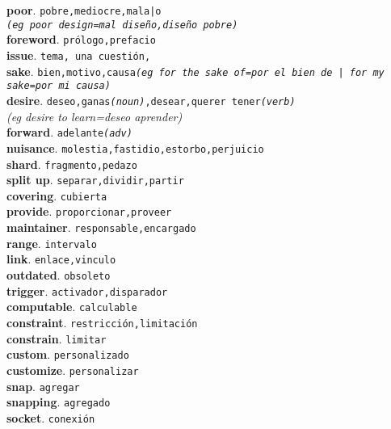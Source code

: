 \documentclass[twocolumn]{article}
\begin{document}
	\textsf{\textbf{poor}}. \texttt{pobre,mediocre,mala|o\\{\scriptsize \textsl{(eg poor design=mal dise\~no,dise\~no pobre)}}}\\
	\textsf{\textbf{foreword}}. \texttt{pr\'ologo,prefacio}\\
	\textsf{\textbf{issue}}. \texttt{tema, una cuesti\'on,}\\
	\textsf{\textbf{sake}}. \texttt{bien,motivo,causa{\scriptsize \textsl{(eg for the sake of=por el bien de | for my sake=por mi causa)}}}\\
	\textsf{\textbf{desire}}. \texttt{deseo,ganas{\scriptsize \textsl{(noun)}},desear,querer tener{\scriptsize \textsl{(verb)}}}\\{\scriptsize \textsl{(eg desire to learn=deseo aprender)}}\\
	\textsf{\textbf{forward}}. \texttt{adelante{\scriptsize \textsl{(adv)}}}\\
	\textsf{\textbf{nuisance}}. \texttt{molestia,fastidio,estorbo,perjuicio}\\
	\textsf{\textbf{shard}}. \texttt{fragmento,pedazo}\\
	\textsf{\textbf{split up}}. \texttt{separar,dividir,partir}\\
	\textsf{\textbf{covering}}. \texttt{cubierta}\\
	\textsf{\textbf{provide}}. \texttt{proporcionar,proveer}\\
	\textsf{\textbf{maintainer}}. \texttt{responsable,encargado}\\
	\textsf{\textbf{range}}. \texttt{intervalo}\\
	\textsf{\textbf{link}}. \texttt{enlace,vinculo}\\
	\textsf{\textbf{outdated}}. \texttt{obsoleto}\\
	\textsf{\textbf{trigger}}. \texttt{activador,disparador}\\
	\textsf{\textbf{computable}}. \texttt{calculable}\\
	\textsf{\textbf{constraint}}. \texttt{restricci\'on,limitaci\'on}\\
	\textsf{\textbf{constrain}}. \texttt{limitar}\\
	\textsf{\textbf{custom}}. \texttt{personalizado}\\
	\textsf{\textbf{customize}}. \texttt{personalizar}\\
	\textsf{\textbf{snap}}. \texttt{agregar}\\
	\textsf{\textbf{snapping}}. \texttt{agregado}\\
	\textsf{\textbf{socket}}. \texttt{conexi\'on}\\
\end{document}
